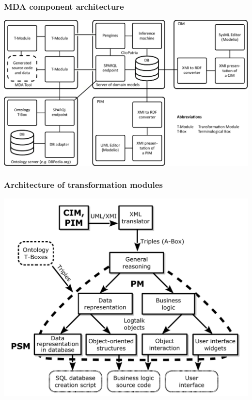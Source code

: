 \documentclass[10pt]{beamer}
\begin{document}
\begin{frame}
  \frametitle{MDA component architecture}
  \centering
  \includegraphics[width=1\linewidth]{architecture-mda-lod-ext.pdf}
\end{frame}

\begin{frame}
  \frametitle{Architecture of transformation modules}
  \centering
  \includegraphics[width=0.9\linewidth]{architect_tree_pres-en-wo-OCL.pdf}
\end{frame}
\end{document}
